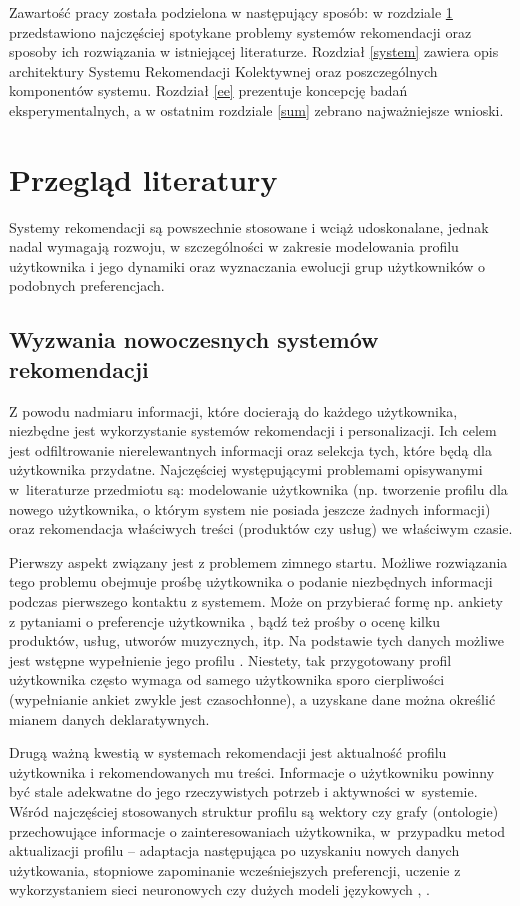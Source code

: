 Zawartość pracy została podzielona w następujący sposób: w rozdziale \ref{rw} przedstawiono najczęściej spotykane problemy systemów rekomendacji oraz sposoby ich rozwiązania w istniejącej literaturze. Rozdział \ref{system} zawiera opis architektury Systemu Rekomendacji Kolektywnej oraz poszczególnych komponentów systemu. Rozdział \ref{ee} prezentuje koncepcję badań eksperymentalnych, a w ostatnim rozdziale \ref{sum} zebrano najważniejsze wnioski.


\section{Przegląd literatury}\label{rw}

Systemy rekomendacji są powszechnie stosowane i wciąż udoskonalane, jednak nadal wymagają rozwoju, w szczególności w zakresie modelowania profilu użytkownika i jego dynamiki oraz wyznaczania ewolucji grup użytkowników o podobnych preferencjach.


\subsection{Wyzwania nowoczesnych systemów rekomendacji}

Z powodu nadmiaru informacji, które docierają do każdego użytkownika, niezbędne jest wykorzystanie systemów rekomendacji i personalizacji. Ich celem jest odfiltrowanie nierelewantnych informacji oraz selekcja tych, które będą dla użytkownika przydatne. Najczęściej występującymi problemami opisywanymi w~literaturze przedmiotu są: modelowanie użytkownika (np. tworzenie profilu dla nowego użytkownika, o którym system nie posiada jeszcze żadnych informacji) oraz rekomendacja właściwych treści (produktów czy usług) we właściwym czasie.

Pierwszy aspekt związany jest z problemem zimnego startu. Możliwe rozwiązania tego problemu obejmuje prośbę użytkownika o podanie niezbędnych informacji podczas pierwszego kontaktu z systemem. Może on przybierać formę np. ankiety z pytaniami o preferencje użytkownika  \cite{isinkaye}, bądź też prośby o ocenę kilku produktów, usług, utworów muzycznych, itp. Na podstawie tych danych możliwe jest wstępne wypełnienie jego profilu \cite{patel}. Niestety, tak przygotowany profil użytkownika często wymaga od samego użytkownika sporo cierpliwości (wypełnianie ankiet zwykle jest czasochłonne), a uzyskane dane można określić mianem danych deklaratywnych. 

Drugą ważną kwestią w systemach rekomendacji jest aktualność profilu użytkownika i rekomendowanych mu treści. Informacje o użytkowniku powinny być stale adekwatne do jego rzeczywistych potrzeb i aktywności w~systemie. Wśród najczęściej stosowanych struktur profilu są wektory czy grafy (ontologie) przechowujące informacje o zainteresowaniach użytkownika, w~przypadku metod aktualizacji profilu -- adaptacja następująca po uzyskaniu nowych danych użytkowania, stopniowe zapominanie wcześniejszych preferencji, uczenie z wykorzystaniem sieci neuronowych czy dużych modeli językowych \cite{sob}, \cite{wu}.

